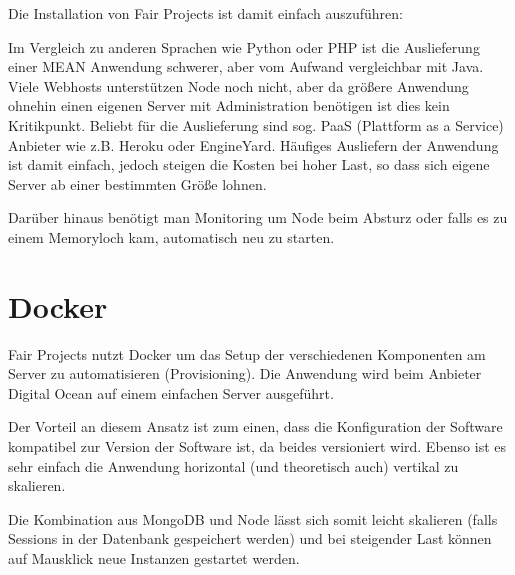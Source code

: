 Die Installation von Fair Projects ist damit einfach auszuführen:

\begin{Shaded}
\begin{Highlighting}[]
 
 

 

 

 
\end{Highlighting}
\end{Shaded}

Im Vergleich zu anderen Sprachen wie Python oder PHP ist die
Auslieferung einer MEAN Anwendung schwerer, aber vom Aufwand
vergleichbar mit Java. Viele Webhosts unterstützen Node noch nicht, aber
da größere Anwendung ohnehin einen eigenen Server mit Administration
benötigen ist dies kein Kritikpunkt. Beliebt für die Auslieferung sind
sog. PaaS (Plattform as a Service) Anbieter wie z.B. Heroku oder
EngineYard. Häufiges Ausliefern der Anwendung ist damit einfach, jedoch
steigen die Kosten bei hoher Last, so dass sich eigene Server ab einer
bestimmten Größe lohnen.

Darüber hinaus benötigt man Monitoring um Node beim Absturz oder falls
es zu einem Memoryloch kam, automatisch neu zu starten.

\section{Docker}\label{docker}

Fair Projects nutzt Docker um das Setup der verschiedenen Komponenten am
Server zu automatisieren (Provisioning). Die Anwendung wird beim
Anbieter Digital Ocean auf einem einfachen Server ausgeführt.

Der Vorteil an diesem Ansatz ist zum einen, dass die Konfiguration der
Software kompatibel zur Version der Software ist, da beides versioniert
wird. Ebenso ist es sehr einfach die Anwendung horizontal (und
theoretisch auch) vertikal zu skalieren.

Die Kombination aus MongoDB und Node lässt sich somit leicht skalieren
(falls Sessions in der Datenbank gespeichert werden) und bei steigender
Last können auf Mausklick neue Instanzen gestartet werden.
